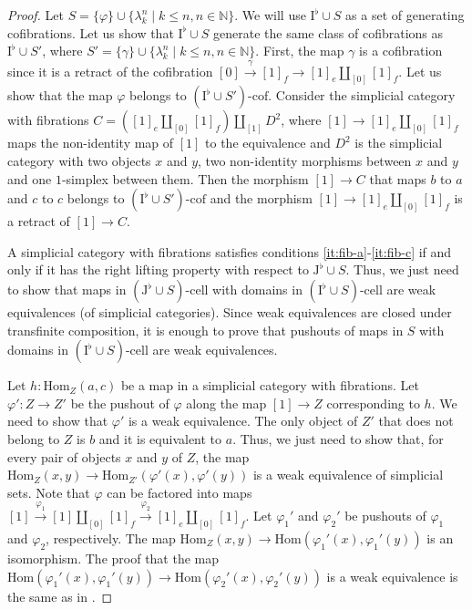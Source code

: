 \documentclass[reqno]{amsart}
\theoremstyle{definition}
\theoremstyle{remark}
\newcommand{\fs}[1]{\mathrm{#1}}
\newcommand{\Hom}{\fs{Hom}}
\newcommand{\I}{\fs{I}}
\newcommand{\J}{\fs{J}}
\newcommand{\class}[2]{#1\text{-}\mathrm{#2}}
\newcommand{\Icell}[1][\I]{\class{#1}{cell}}
\newcommand{\Icof}[1][\I]{\class{#1}{cof}}
\numberwithin{figure}{section}
\begin{document}
\begin{proof}
Let $S = \{ \varphi \} \cup \{ \lambda^n_k \mid k \leq n, n \in \mathbb{N} \}$.
We will use $\I^\flat \cup S$ as a set of generating cofibrations.
Let us show that $\I^\flat \cup S$ generate the same class of cofibrations as $\I^\flat \cup S'$, where $S' = \{ \gamma \} \cup \{ \lambda^n_k \mid k \leq n, n \in \mathbb{N} \}$.
First, the map $\gamma$ is a cofibration since it is a retract of the cofibration $[0] \xrightarrow{\gamma} [1]_f \to [1]_e \amalg_{[0]} [1]_f$.
Let us show that the map $\varphi$ belongs to $\Icof[(\I^\flat \cup S')]$.
Consider the simplicial category with fibrations $C = ([1]_e \amalg_{[0]} [1]_f) \amalg_{[1]} D^2$,
where $[1] \to [1]_e \amalg_{[0]} [1]_f$ maps the non-identity map of $[1]$ to the equivalence and $D^2$ is the simplicial category with two objects $x$ and $y$,
two non-identity morphisms between $x$ and $y$ and one $1$-simplex between them.
Then the morphism $[1] \to C$ that maps $b$ to $a$ and $c$ to $c$ belongs to $\Icof[(\I^\flat \cup S')]$ and the morphism $[1] \to [1]_e \amalg_{[0]} [1]_f$ is a retract of $[1] \to C$.

A simplicial category with fibrations satisfies conditions \eqref{it:fib-a}-\eqref{it:fib-c} if and only if it has the right lifting property with respect to $\J^\flat \cup S$.
Thus, we just need to show that maps in $\Icell[(\J^\flat \cup S)]$ with domains in $\Icell[(\I^\flat \cup S)]$ are weak equivalences (of simplicial categories).
Since weak equivalences are closed under transfinite composition, it is enough to prove that pushouts of maps in $S$ with domains in $\Icell[(\I^\flat \cup S)]$ are weak equivalences.

Let $h : \Hom_Z(a,c)$ be a map in a simplicial category with fibrations.
Let $\varphi' : Z \to Z'$ be the pushout of $\varphi$ along the map $[1] \to Z$ corresponding to $h$.
We need to show that $\varphi'$ is a weak equivalence.
The only object of $Z'$ that does not belong to $Z$ is $b$ and it is equivalent to $a$.
Thus, we just need to show that, for every pair of objects $x$ and $y$ of $Z$, the map $\Hom_Z(x,y) \to \Hom_{Z'}(\varphi'(x),\varphi'(y))$ is a weak equivalence of simplicial sets.
Note that $\varphi$ can be factored into maps $[1] \xrightarrow{\varphi_1} [1] \amalg_{[0]} [1]_f \xrightarrow{\varphi_2} [1]_e \amalg_{[0]} [1]_f$.
Let $\varphi_1'$ and $\varphi_2'$ be pushouts of $\varphi_1$ and $\varphi_2$, respectively.
The map $\Hom_Z(x,y) \to \Hom(\varphi_1'(x),\varphi_1'(y))$ is an isomorphism.
The proof that the map $\Hom(\varphi_1'(x),\varphi_1'(y)) \to \Hom(\varphi_2'(x),\varphi_2'(y))$ is a weak equivalence is the same as in \cite[Proposition~A.3.2.4]{lurie-topos}.


\end{proof}
\end{document}
